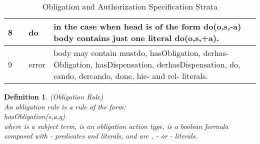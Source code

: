\documentclass[12pt,journal,letterpaper,onecolumn]{IEEEtran}
\newtheorem{definition}{Definition}[section]
\begin{document}
\begin{table}[h]
\begin{center}
\begin{minipage}[t]{6in}
\begin{tabular}{|l|l|l|p{3.2in}|}
 8 & & do & in the case when head is of the form
do(o,s,-a) body
contains just one literal do(o,s,+a).\\

\hline

9 &  & error & body may contain mustdo, hasObligation, derhas-
Obligation, hasDispensation, derhasDispensation, do, cando,
dercando, done,
hie- and rel- literals.\\

\hline
\end{tabular}
\normalsize
\end{minipage}
\end{center}
\caption{Obligation and Authorization Specification Strata}
\label{table:strata}
\end{table}




\begin{definition}(Obligation Rule)\\
An {\em obligation rule} is a rule of the form:\\
{\ttfamily hasObligation(s,a,q)} \\
 where 
is a subject term,  is an obligation action type,  is a
boolean formula composed with - predicates and  literals,
and  are , - or - literals.
\label{def:obligationrule}
\end{definition}
\end{document}
